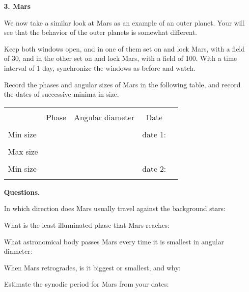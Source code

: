 \documentclass[12pt]{article}
\begin{document}
\medskip\bigskip
\noindent
{\bf 3. Mars }

\medskip
\noindent
We now take a similar look at Mars as an example of an
outer planet. Your will see that the behavior of the outer planets 
is somewhat different.

\medskip
Keep both windows open, and in one of them set on and lock Mars, with
a field of 30\arcsec, and in the other set on and lock Mars, with a
field of 100\deg. With a time interval of 1 day, synchronize the
windows as before and watch.

Record the phases and angular sizes of Mars in the following table,
and record the dates of successive minima in size.



	\begin{center}
\begin{tabular}{lcccc} \hline \\ [-6pt]
   & \hspace{0.5cm} Phase
 \hspace{0.5cm} & \hspace{0.2cm} Angular diameter \hspace{0.2cm} &
 \hspace{0.5cm} Date  \\ [6pt]
\hline \\ [-6pt]
Min size  &  &  & date 1:   \\ \hline \\ [-6pt]
Max size &  &  &      \\ \hline \\ [-6pt]
Min size  &  &  & date 2:  \\ \hline \\ [-6pt]
\end{tabular}
\end{center}

\medskip\noindent
{\bf Questions.}

\medskip\noindent 
In which direction does Mars usually travel against the background stars: \makebox[4cm]{\hrulefill}

\medskip\noindent
What is the least illuminated phase that Mars reaches: \makebox[4cm]{\hrulefill}

\medskip\noindent
What astronomical body passes Mars every time it is smallest in
angular diameter:
\makebox[4cm]{\hrulefill}

\medskip\noindent
When Mars retrogrades, is it biggest or smallest, and why: \makebox[4cm]{\hrulefill}

\medskip\noindent
Estimate the synodic period for Mars from your dates:
\makebox[4cm]{\hrulefill}
\end{document}
